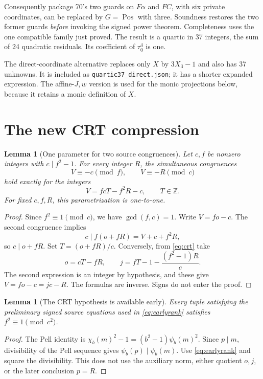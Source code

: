 \documentclass[11pt]{article}
\newtheorem{lemma}[theorem]{Lemma}
\theoremstyle{remark}\newtheorem{remark}[theorem]{Remark}
\newcommand{\Z}{\mathbb Z}
\newcommand{\Pos}{\operatorname{Pos}}
\begin{document}
Consequently package 70's two guards on $F\alpha$ and $FC$, with six
private coordinates, can be replaced by $G=\Pos$ with three. Soundness
restores the two former guards \emph{before} invoking the signed power
theorem. Completeness uses the one compatible family just proved. The
result is a quartic in 37 integers, the sum of 24 quadratic residuals.
Its coefficient of $\tau_0^4$ is one.

The direct-coordinate alternative replaces only $X$ by $3X_3-1$ and
also has 37 unknowns. It is included as
\texttt{quartic37\_direct.json}; it has a shorter expanded expression.
The affine-$J,w$ version is used for the monic projections below,
because it retains a monic definition of $X$.

\section{The new CRT compression}
\label{sec:crt}

\begin{lemma}[One parameter for two source congruences]
\label{lem:crt}
Let $c,f$ be nonzero integers with $c\mid f^2-1$. For every integer $R$,
the simultaneous congruences
\[
 V\equiv-c\pmod f,\qquad V\equiv-R\pmod c
\]
hold exactly for the integers
\begin{equation}
 V=fcT-f^2R-c,\qquad T\in\Z.                 \label{eq:crt}
\end{equation}
For fixed $c,f,R$, this parametrization is one-to-one.
\end{lemma}
\begin{proof}
Since $f^2\equiv1\pmod c$, we have $\gcd(f,c)=1$. Write
$V=fo-c$. The second congruence implies
\[
 c\mid f(o+fR)=V+c+f^2R,
\]
so $c\mid o+fR$. Set $T=(o+fR)/c$.
Conversely, from \eqref{eq:crt} take
\begin{equation}
 o=cT-fR,\qquad
 j=fT-1-\frac{(f^2-1)R}{c}.                  \label{eq:restoreoj}
\end{equation}
The second expression is an integer by hypothesis, and these give
$V=fo-c=jc-R$. The formulas are inverse. Signs do not enter the proof.
\end{proof}

\begin{lemma}[The CRT hypothesis is available early]
Every tuple satisfying the preliminary signed source equations used in
\eqref{eq:earlyrank} satisfies $f^2\equiv1\pmod{c^2}$.
\end{lemma}
\begin{proof}
The Pell identity is
$\chi_b(m)^2-1=(b^2-1)\psi_b(m)^2$.
Since $p\mid m$, divisibility of the Pell sequence gives
$\psi_b(p)\mid\psi_b(m)$. Use \eqref{eq:earlyrank} and square the
divisibility. This does not use the auxiliary norm, either quotient
$o,j$, or the later conclusion $p=R$.
\end{proof}
\end{document}
